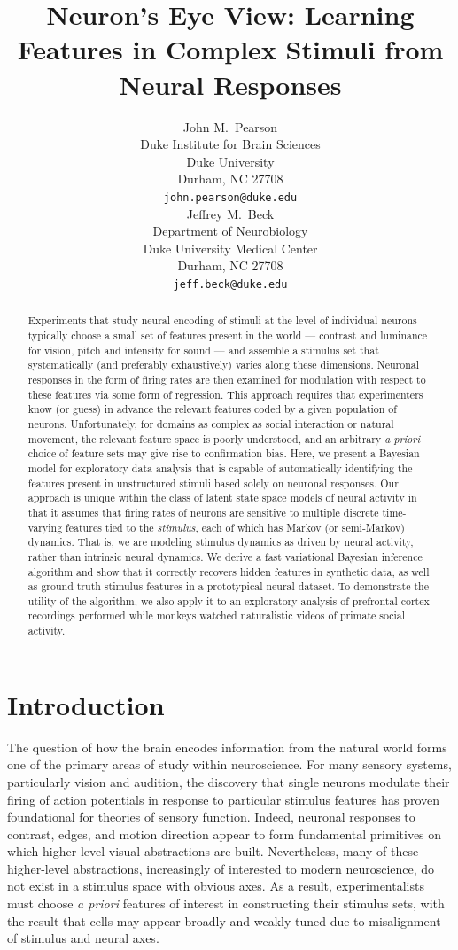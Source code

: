 \documentclass{article} %
\title{Neuron's Eye View: Learning Features in Complex Stimuli from Neural Responses}
\author{
John M.~Pearson\\
Duke Institute for Brain Sciences \\
Duke University\\
Durham, NC 27708 \\
\texttt{john.pearson@duke.edu} \\
\And
Jeffrey M.~Beck \\
Department of Neurobiology \\
Duke University Medical Center \\
Durham, NC 27708 \\
\texttt{jeff.beck@duke.edu} \\
}
\begin{document}
\maketitle

\begin{abstract}
Experiments that study neural encoding of stimuli at the level of individual neurons typically choose a small set of features present in the world --- contrast and luminance for vision, pitch and intensity for sound --- and assemble a stimulus set that systematically (and preferably exhaustively) varies along these dimensions. Neuronal responses in the form of firing rates are then examined for modulation with respect to these features via some form of regression. This approach requires that experimenters know (or guess) in advance the relevant features coded by a given population of neurons. Unfortunately, for domains as complex as social interaction or natural movement, the relevant feature space is poorly understood, and an arbitrary \emph{a priori} choice of feature sets may give rise to confirmation bias. Here, we present a Bayesian model for exploratory data analysis that is capable of automatically identifying the features present in unstructured stimuli based solely on neuronal responses. Our approach is unique within the class of latent state space models of neural activity in that it assumes that firing rates of neurons are sensitive to multiple discrete time-varying features tied to the \emph{stimulus}, each of which has Markov (or semi-Markov) dynamics. That is, we are modeling stimulus dynamics as driven by neural activity, rather than intrinsic neural dynamics.  We derive a fast variational Bayesian inference algorithm and show that it correctly recovers hidden features in synthetic data, as well as ground-truth stimulus features in a prototypical neural dataset. To demonstrate the utility of the algorithm, we also apply it to an exploratory analysis of prefrontal cortex recordings performed while monkeys watched naturalistic videos of primate social activity.
\end{abstract}

\section{Introduction}
The question of how the brain encodes information from the natural world forms one of the primary areas of study within neuroscience. For many sensory systems, particularly vision and audition, the discovery that single neurons modulate their firing of action potentials in response to particular stimulus features has proven foundational for theories of sensory function. Indeed, neuronal responses to contrast, edges, and motion direction appear to form fundamental primitives on which higher-level visual abstractions are built. Nevertheless, many of these higher-level abstractions, increasingly of interested to modern neuroscience, do not exist in a stimulus space with obvious axes. As a result, experimentalists must choose \emph{a priori} features of interest in constructing their stimulus sets, with the result that cells may appear broadly and weakly tuned due to misalignment of stimulus and neural axes.
\end{document}
